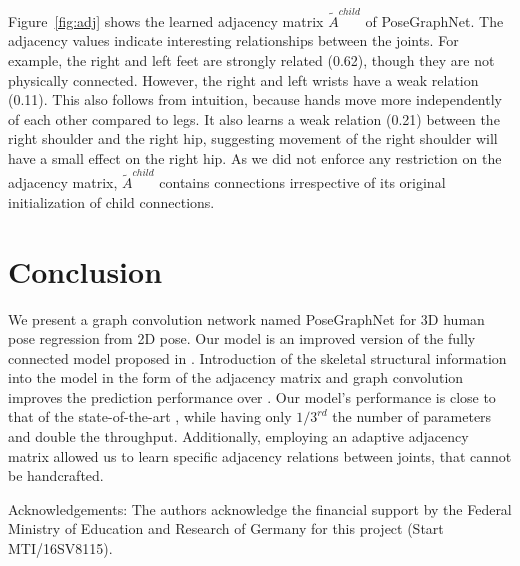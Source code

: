 \documentclass{article}
\begin{document}
Figure~\ref{fig:adj} shows the learned adjacency matrix $\tilde{A}^{child}$ of PoseGraphNet.
The adjacency values indicate interesting relationships between the joints.
For example, the right and left feet are strongly related (0.62), though they are not physically connected.
However, the right and left wrists have a weak relation (0.11).
This also follows from intuition, because hands move more independently of each other compared to legs.
It also learns a weak relation (0.21) between the right shoulder and the right hip, suggesting movement of the right shoulder will have a small effect on the right hip.
As we did not enforce any restriction on the adjacency matrix, $\tilde{A}^{child}$ contains connections irrespective of its original initialization of child connections.


\section{Conclusion}
We present a graph convolution network named PoseGraphNet for 3D human pose regression from 2D pose.
Our model is an improved version of the fully connected model proposed in \cite{Martinez2017}. Introduction of the skeletal structural information into the model in the form of the adjacency matrix and graph convolution improves the prediction performance over \cite{Martinez2017}. Our model's performance is close to that of the state-of-the-art \cite{Cai2019}, while having only $1/3^{rd}$ the number of parameters and double the throughput. Additionally, employing an adaptive adjacency matrix allowed us to learn specific adjacency relations between joints, that cannot be handcrafted.

Acknowledgements: The authors acknowledge the financial support by the Federal Ministry of Education and Research of Germany for this project (Start MTI/16SV8115).




\end{document}
